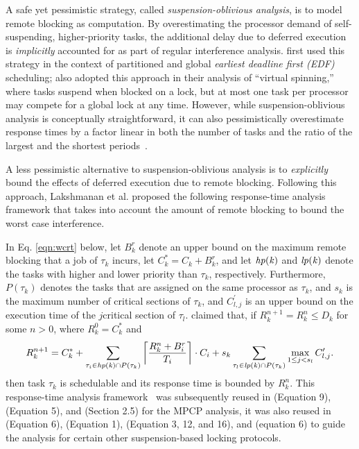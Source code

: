 A safe yet pessimistic strategy, called \emph{suspension-oblivious analysis}, is to model remote blocking as computation. By overestimating the processor demand of self-suspending, higher-priority tasks, the additional delay due to deferred execution is \emph{implicitly} accounted for as part of regular interference analysis. \cite{block-2007} first used this strategy in the context of partitioned and global \emph{earliest deadline first (EDF)} scheduling;  \cite{lakshmanan-2009} also adopted this approach in their analysis of ``virtual spinning,'' where tasks suspend when blocked on a lock, but at most one task per processor may compete for a global lock at any time. However, while suspension-oblivious analysis is conceptually straightforward, it can also pessimistically overestimate response times by a factor linear in both the number of tasks and the ratio of the largest and the shortest periods~\cite{wieder-2013}.

A less pessimistic alternative to suspension-oblivious analysis is to \emph{explicitly} bound the effects of deferred execution due to remote blocking. Following this approach, Lakshmanan et al. \cite{lakshmanan-2009} proposed the following response-time analysis framework that takes into account the amount of remote blocking to bound the worst case interference.

In Eq. \eqref{eqn:wcrt} below, let $B_k^r$ denote an upper bound on the maximum remote blocking that a job of $\tau_k$ incurs, let $C_k^{\ast} = C_k + B_k^r$, and let $\mathit{hp(k)}$ and $\mathit{lp(k)}$ denote the tasks with higher and lower priority than $\tau_k$, respectively. Furthermore, $P(\tau_k)$ denotes the tasks that are assigned on the same processor as $\tau_k$, and $s_k$ is the maximum number of critical sections of $\tau_k$, and $C_{l,j}^{\prime}$ is an upper bound on the execution time of the $j$\xth critical section of $\tau_l$. \cite{lakshmanan-2009} claimed that, if $R_k^{n+1} = R_k^n \leq D_k$ for some $n > 0$, where $R_k^0 = C_k^{\ast}$ and
\begin{equation}
\label{eqn:wcrt}
R_k^{n+1} = C_k^{\ast} + \sum_{\tau_i \in \mathit{hp(k)} \cap P(\tau_k)} \left \lceil \frac{R_k^n + B_i^r}{T_i} \right \rceil \cdot C_i + s_k \sum_{\tau_l \in \mathit{lp(k)} \cap P(\tau_k)} \max_{1 \leq j < s_l} C_{l,j}^{\prime}.  
\end{equation}
then task $\tau_k$ is schedulable and its response time is bounded by $R_k^n$. This  response-time analysis framework~\cite{lakshmanan-2009} was subsequently reused in \cite{zeng-2011} (Equation 9), \cite{han-2014}(Equation 5), and \cite{yang-2014} (Section 2.5) for the MPCP analysis, it was also reused in \cite{yang-2013} (Equation 6), \cite{bbb-2013} (Equation 1), \cite{carminati-2014} (Equation 3, 12, and 16), and \cite{kim-2014} (equation 6) to guide the analysis for certain other suspension-based locking protocols.

